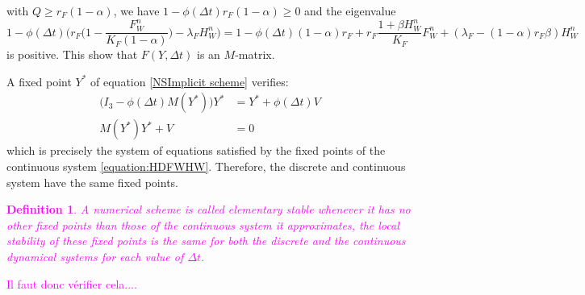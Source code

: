 \documentclass{article}
\newcommand{\lfw}{\lambda_{F}}
\newcommand{\lfw}{\lambda_{F}}
\newcommand{\cI}{\mathcal{I}}
\newcommand{\marc}[1]{\textcolor{teal}{#1}}
\newcommand{\YD}[1]{\textcolor{magenta}{#1}}
\newtheorem{definition}{Definition}
\begin{document}
with $Q \geq r_F(1 - \alpha)$, we have $1 - \phi(\Delta t)r_F(1-\alpha) \geq 0$ and the eigenvalue $$1 - \phi(\Delta t) \Big(r_F\Big(1 - \dfrac{F_W^n}{K_F(1 - \alpha)} \Big) - \lfw H_W^n \Big) = 1 - \phi(\Delta t)(1-\alpha)r_F + r_F \dfrac{1 + \beta H_W^n}{K_F}F^n_W + (\lfw - (1-\alpha) r_F  \beta) H^n_W $$ is positive. This show that $F(Y, \Delta t)$ is an $M$-matrix.

\medskip
A fixed point $Y^*$ of equation \eqref{NSImplicit scheme} verifies:
\begin{align*}
\Big(I_3 - \phi(\Delta t) M(Y^*) \Big) Y^* &= Y^* + \phi(\Delta t)V \\
 M(Y^*) Y^* + V&= 0
\end{align*}
which is precisely the system of equations satisfied by the fixed points of the continuous system \eqref{equation:HDFWHW}. Therefore, the discrete and continuous system have the same fixed points.

\YD{
\begin{definition}
A numerical scheme is called elementary stable whenever it has no other fixed points than those of the continuous system it approximates, the local stability of these fixed points is the same for both the discrete and the continuous dynamical systems for each value of $\Delta t$.
\end{definition}
Il faut donc vérifier cela....
}


\end{document}
